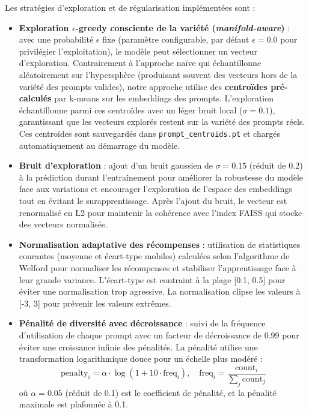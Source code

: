 \begin{enumerate}
    Les stratégies d'exploration et de régularisation implémentées sont :
    \begin{itemize}
        \item \textbf{Exploration $\epsilon$-greedy consciente de la variété (\textit{manifold-aware})} : avec une probabilité $\epsilon$ fixe (paramètre configurable, par défaut $\epsilon = 0.0$ pour privilégier l'exploitation), le modèle peut sélectionner un vecteur d'exploration. Contrairement à l'approche naïve qui échantillonne aléatoirement sur l'hypersphère (produisant souvent des vecteurs hors de la variété des prompts valides), notre approche utilise des \textbf{centroïdes pré-calculés} par k-means sur les embeddings des prompts. L'exploration échantillonne parmi ces centroïdes avec un léger bruit local ($\sigma = 0.1$), garantissant que les vecteurs explorés restent sur la variété des prompts réels. Ces centroïdes sont sauvegardés dans \texttt{prompt\_centroids.pt} et chargés automatiquement au démarrage du modèle.
        
        \item \textbf{Bruit d'exploration} : ajout d'un bruit gaussien de $\sigma = 0.15$ (réduit de 0.2) à la prédiction durant l'entraînement pour améliorer la robustesse du modèle face aux variations et encourager l'exploration de l'espace des embeddings tout en évitant le surapprentissage. Après l'ajout du bruit, le vecteur est renormalisé en L2 pour maintenir la cohérence avec l'index FAISS qui stocke des vecteurs normalisés.
        
        \item \textbf{Normalisation adaptative des récompenses} : utilisation de statistiques courantes (moyenne et écart-type mobiles) calculées selon l'algorithme de Welford pour normaliser les récompenses et stabiliser l'apprentissage face à leur grande variance. L'écart-type est contraint à la plage [0.1, 0.5] pour éviter une normalisation trop agressive. La normalisation clipse les valeurs à [-3, 3] pour prévenir les valeurs extrêmes.
        
        \item \textbf{Pénalité de diversité avec décroissance} : suivi de la fréquence d'utilisation de chaque prompt avec un facteur de décroissance de 0.99 pour éviter une croissance infinie des pénalités. La pénalité utilise une transformation logarithmique douce pour un échelle plus modéré : 
        \[
        \text{penalty}_i = \alpha \cdot \log(1 + 10 \cdot \text{freq}_i), \quad \text{freq}_i = \frac{\text{count}_i}{\sum_j \text{count}_j}
        \]
        où $\alpha = 0.05$ (réduit de 0.1) est le coefficient de pénalité, et la pénalité maximale est plafonnée à 0.1.
    \end{itemize}


\end{enumerate}
